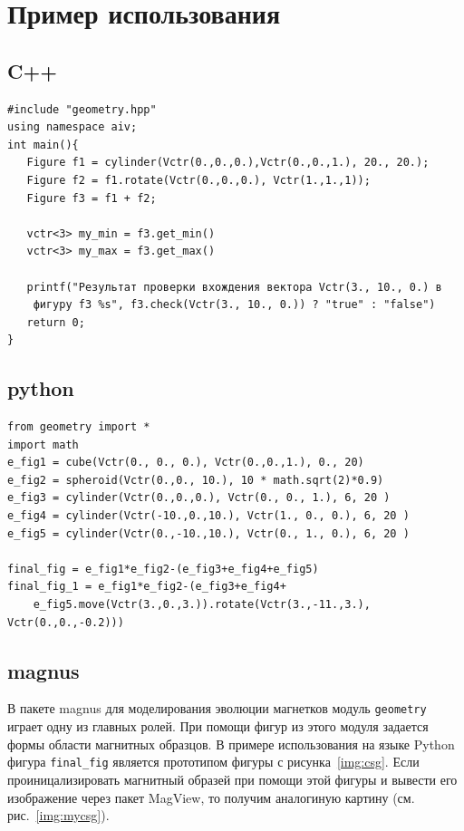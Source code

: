 \section{Пример использования}
\subsection{C++}
\begin{verbatim}
#include "geometry.hpp"
using namespace aiv;
int main(){
   Figure f1 = cylinder(Vctr(0.,0.,0.),Vctr(0.,0.,1.), 20., 20.);
   Figure f2 = f1.rotate(Vctr(0.,0.,0.), Vctr(1.,1.,1));
   Figure f3 = f1 + f2;

   vctr<3> my_min = f3.get_min()
   vctr<3> my_max = f3.get_max()

   printf("Результат проверки вхождения вектора Vctr(3., 10., 0.) в 
    фигуру f3 %s", f3.check(Vctr(3., 10., 0.)) ? "true" : "false")
   return 0;
}
\end{verbatim}

\subsection{python}
\begin{verbatim}
from geometry import *
import math
e_fig1 = cube(Vctr(0., 0., 0.), Vctr(0.,0.,1.), 0., 20)
e_fig2 = spheroid(Vctr(0.,0., 10.), 10 * math.sqrt(2)*0.9)
e_fig3 = cylinder(Vctr(0.,0.,0.), Vctr(0., 0., 1.), 6, 20 )
e_fig4 = cylinder(Vctr(-10.,0.,10.), Vctr(1., 0., 0.), 6, 20 )
e_fig5 = cylinder(Vctr(0.,-10.,10.), Vctr(0., 1., 0.), 6, 20 )

final_fig = e_fig1*e_fig2-(e_fig3+e_fig4+e_fig5)
final_fig_1 = e_fig1*e_fig2-(e_fig3+e_fig4+
    e_fig5.move(Vctr(3.,0.,3.)).rotate(Vctr(3.,-11.,3.), Vctr(0.,0.,-0.2)))
\end{verbatim}

\subsection{magnus}
В пакете magnus для моделирования эволюции магнетков модуль \verb"geometry" играет одну из главных ролей. При помощи фигур из этого модуля задается формы области магнитных образцов.
В примере использования на языке {\sf Python} фигура \verb"final_fig" является прототипом фигуры с рисунка~\ref{img:csg}. Если проиницализировать магнитный образей при помощи этой фигуры и вывести его изображение через пакет {\sf MagView}, то получим аналогиную картину (см. рис.~\ref{img:mycsg}).

